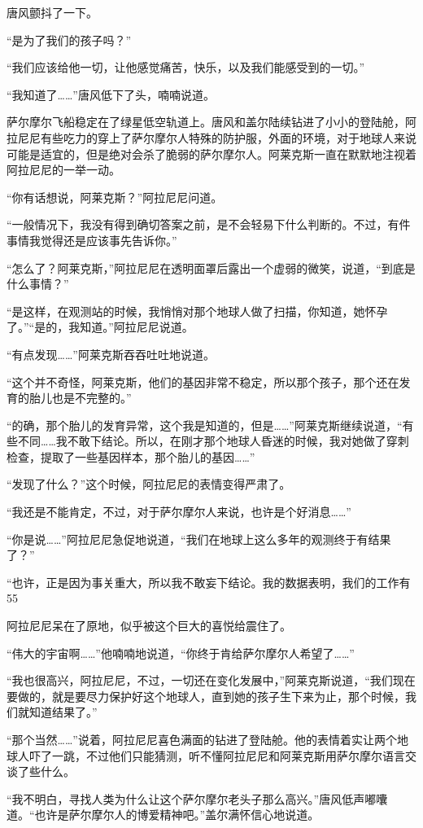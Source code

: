 唐风颤抖了一下。

“是为了我们的孩子吗？”

“我们应该给他一切，让他感觉痛苦，快乐，以及我们能感受到的一切。”

“我知道了……”唐风低下了头，喃喃说道。

萨尔摩尔飞船稳定在了绿星低空轨道上。唐风和盖尔陆续钻进了小小的登陆舱，阿拉尼尼有些吃力的穿上了萨尔摩尔人特殊的防护服，外面的环境，对于地球人来说可能是适宜的，但是绝对会杀了脆弱的萨尔摩尔人。阿莱克斯一直在默默地注视着阿拉尼尼的一举一动。

“你有话想说，阿莱克斯？”阿拉尼尼问道。

“一般情况下，我没有得到确切答案之前，是不会轻易下什么判断的。不过，有件事情我觉得还是应该事先告诉你。”

“怎么了？阿莱克斯，”阿拉尼尼在透明面罩后露出一个虚弱的微笑，说道，“到底是什么事情？”

“是这样，在观测站的时候，我悄悄对那个地球人做了扫描，你知道，她怀孕了。”“是的，我知道。”阿拉尼尼说道。

“有点发现……”阿莱克斯吞吞吐吐地说道。

“这个并不奇怪，阿莱克斯，他们的基因非常不稳定，所以那个孩子，那个还在发育的胎儿也是不完整的。”

“的确，那个胎儿的发育异常，这个我是知道的，但是……”阿莱克斯继续说道，“有些不同……我不敢下结论。所以，在刚才那个地球人昏迷的时候，我对她做了穿刺检查，提取了一些基因样本，那个胎儿的基因……”

“发现了什么？”这个时候，阿拉尼尼的表情变得严肃了。

“我还是不能肯定，不过，对于萨尔摩尔人来说，也许是个好消息……”

“你是说……”阿拉尼尼急促地说道，“我们在地球上这么多年的观测终于有结果了？”

“也许，正是因为事关重大，所以我不敢妄下结论。我的数据表明，我们的工作有55%

阿拉尼尼呆在了原地，似乎被这个巨大的喜悦给震住了。

“伟大的宇宙啊……”他喃喃地说道，“你终于肯给萨尔摩尔人希望了……”

“我也很高兴，阿拉尼尼，不过，一切还在变化发展中，”阿莱克斯说道，“我们现在要做的，就是要尽力保护好这个地球人，直到她的孩子生下来为止，那个时候，我们就知道结果了。”

“那个当然……”说着，阿拉尼尼喜色满面的钻进了登陆舱。他的表情着实让两个地球人吓了一跳，不过他们只能猜测，听不懂阿拉尼尼和阿莱克斯用萨尔摩尔语言交谈了些什么。

“我不明白，寻找人类为什么让这个萨尔摩尔老头子那么高兴。”唐风低声嘟囔道。“也许是萨尔摩尔人的博爱精神吧。”盖尔满怀信心地说道。

